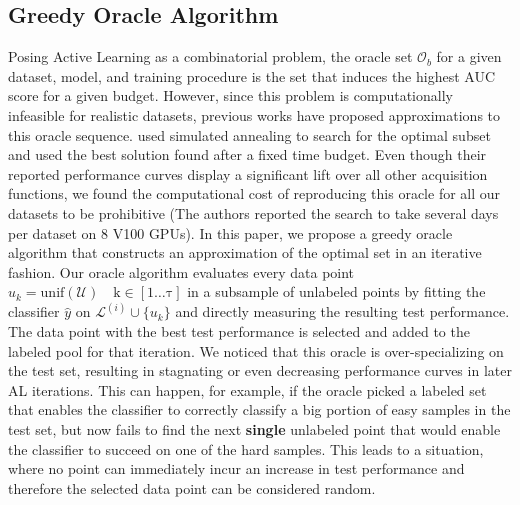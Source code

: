 \documentclass[]{article}
\begin{document}
\subsection{Greedy Oracle Algorithm}\label{sec:oracle}

Posing Active Learning as a combinatorial problem, the oracle set $\mathcal{O}_b$ for a given dataset, model, and training procedure is the set that induces the highest AUC score for a given budget.
However, since this problem is computationally infeasible for realistic datasets, previous works have proposed approximations to this oracle sequence. 
\cite{zhou2021towards} used simulated annealing to search for the optimal subset and used the best  solution found after a fixed time budget. 
Even though their reported performance curves display a significant lift over all other acquisition functions, we found the computational cost of reproducing this oracle for all our datasets to be prohibitive (The authors reported the search to take several days per dataset on 8 V100 GPUs).
In this paper, we propose a greedy oracle algorithm that constructs an approximation of the optimal set in an iterative fashion.
Our oracle algorithm evaluates every data point $u_k = \operatorname{unif(\mathcal{U}) \quad k \in [1 \ldots \tau]}$ in a subsample of unlabeled points by fitting the classifier $\hat y$ on $\mathcal{L}^{(i)} \cup \{u_k\}$ and directly measuring the resulting test performance.
The data point with the best test performance is selected and added to the labeled pool for that iteration.
We noticed that this oracle is over-specializing on the test set, resulting in stagnating or even decreasing performance curves in later AL iterations.
This can happen, for example, if the oracle picked a labeled set that enables the classifier to correctly classify a big portion of easy samples in the test set, but now fails to find the next \textbf{single} unlabeled point that would enable the classifier to succeed on one of the hard samples.
This leads to a situation, where no point can immediately incur an increase in test performance and therefore the selected data point can be considered random.
\end{document}
